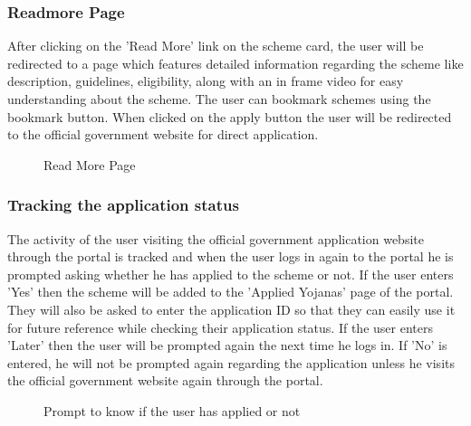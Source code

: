 \documentclass[conference]{IEEEtran}
\begin{document}
\subsubsection{Readmore Page}
After clicking on the 'Read More' link on the scheme card, the user will be redirected to a page which features detailed information regarding the scheme like description, guidelines, eligibility, along with an in frame video for easy understanding about the scheme. The user can bookmark schemes using the bookmark button. When clicked on the apply button the user will be redirected to the official government website for direct application.
\begin{figure}[h!]
\centering
{}
\caption{Read More Page}
\end{figure}
\subsubsection{Tracking the application status}
The activity of the user visiting the official government application website through the portal is tracked and when the user logs in again to the portal he is prompted asking whether he has applied to the scheme or not. If the user enters 'Yes' then the scheme will be added to the 'Applied Yojanas' page of the portal. They will also be asked to enter the application ID so that they can easily use it for future reference while checking their application status. If the user enters 'Later' then the user will be prompted again the next time he logs in. If 'No' is entered, he will not be prompted again regarding the application unless he visits the official government website again through the portal.
\begin{figure}[h!]
\centering
{}
\caption{Prompt to know if the user has applied or not}
\end{figure}
\end{document}
